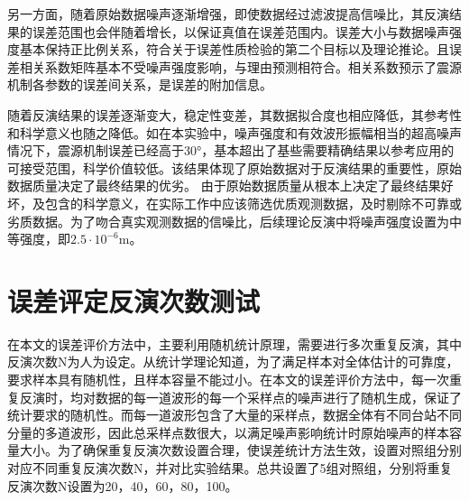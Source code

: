 另一方面，随着原始数据噪声逐渐增强，即使数据经过滤波提高信噪比，其反演结果的误差范围也会伴随着增长，以保证真值在误差范围内。误差大小与数据噪声强度基本保持正比例关系，符合关于误差性质检验的第二个目标以及理论推论。且误差相关系数矩阵基本不受噪声强度影响，与理由预测相符合。相关系数预示了震源机制各参数的误差间关系，是误差的附加信息。

随着反演结果的误差逐渐变大，稳定性变差，其数据拟合度也相应降低，其参考性和科学意义也随之降低。如在本实验中，噪声强度和有效波形振幅相当的超高噪声情况下，震源机制误差已经高于30°，基本超出了基些需要精确结果以参考应用的可接受范围，科学价值较低。该结果体现了原始数据对于反演结果的重要性，原始数据质量决定了最终结果的优劣。
由于原始数据质量从根本上决定了最终结果好坏，及包含的科学意义，在实际工作中应该筛选优质观测数据，及时剔除不可靠或劣质数据。为了吻合真实观测数据的信噪比，后续理论反演中将噪声强度设置为中等强度，即$2.5\cdot10^{-6}$m。

\section{误差评定反演次数测试}
在本文的误差评价方法中，主要利用随机统计原理，需要进行多次重复反演，其中反演次数N为人为设定。从统计学理论知道，为了满足样本对全体估计的可靠度，要求样本具有随机性，且样本容量不能过小。在本文的误差评价方法中，每一次重复反演时，均对数据的每一道波形的每一个采样点的噪声进行了随机生成，保证了统计要求的随机性。而每一道波形包含了大量的采样点，数据全体有不同台站不同分量的多道波形，因此总采样点数很大，以满足噪声影响统计时原始噪声的样本容量大小。为了确保重复反演次数设置合理，使误差统计方法生效，设置对照组分别对应不同重复反演次数N，并对比实验结果。总共设置了5组对照组，分别将重复反演次数N设置为20，40，60，80，100。

